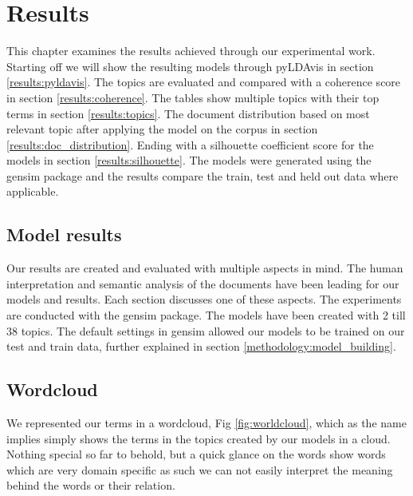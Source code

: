 \chapter{Results}
\label{ch:results}

This chapter examines the results achieved through our experimental work.
Starting off we will show the resulting models through pyLDAvis in section \ref{results:pyldavis}. The topics are evaluated and compared with a coherence score in section \ref{results:coherence}. The tables show multiple topics with their top terms in section \ref{results:topics}. The document distribution based on most relevant topic after applying the model on the corpus in section \ref{results:doc_distribution}. Ending with a silhouette coefficient score for the models in  section \ref{results:silhouette}. The models were generated using the gensim package and the results compare the train, test and held out data where applicable. 



\section{Model results}\label{results:modelresults}
Our results are created and evaluated with multiple aspects in mind. The human interpretation and semantic analysis of the documents have been leading for our models and results. Each section discusses one of these aspects. The experiments are conducted with the gensim package. The models have been created with 2 till 38 topics. The default settings in gensim allowed our models to be trained on our test and train data, further explained in section \ref{methodology:model_building}. 

\FloatBarrier
\section{Wordcloud}\label{results:wordcloud}
We represented our terms in a wordcloud, Fig \ref{fig:worldcloud}, which as the name implies simply shows the terms in the topics created by our models in a cloud. Nothing special so far to behold, but a quick glance on the words show words which are very domain specific as such we can not easily interpret the meaning behind the words or their relation.

